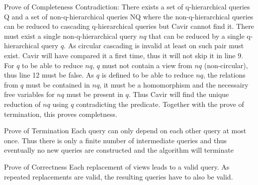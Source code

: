 \documentclass[]{article}
\begin{document}
\begin{section}{Prove of Completeness}
	Contradiction: There exists a set of q-hierarchical queries Q and a set of non-q-hierarchical queries NQ where the non-q-hierarchical queries can be reduced to cascading q-hierarchical queries but Cavir cannot find it. There must exist a single non-q-hierarchical query $nq$ that can be reduced by a single q-hierarchical query $q$. As circular cascading is invalid at least on such pair must exist.
	Cavir will have compared it a first time, thus it will not skip it in line 9.
	For $q$ to be able to reduce $nq$, $q$ must not contain a view from $nq$ (non-circular), thus line 12 must be false.
	As $q$ is defined to be able to reduce $nq$, the relations from $q$ must be contained in $nq$, it must be a homomorphism and the necessairy free variables for $nq$ must be present in $q$. Thus Cavir will find the unique reduction of $nq$ using $q$ contradicting the predicate.
	Together with the prove of termination, this proves completness.
	
\end{section}
\begin{section}{Prove of Termination}
	Each query can only depend on each other query at most once. Thus there is only a finite number of intermediate queries and thus eventually no new queries are constructed and the algorithm will terminate	
\end{section}
\begin{section}{Prove of Correctness}
	Each replacement of views leads to a valid query. As repeated replacements are valid, the resulting queries have to also be valid.
\end{section}
\end{document}
